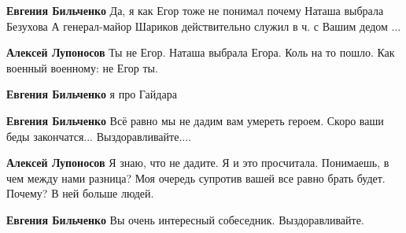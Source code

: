 \begin{itemize}
\begin{itemize}
\textbf{Евгения Бильченко} Да, я как Егор тоже не понимал почему Наташа выбрала Безухова \Smiley[1.0][yellow] А генерал-майор Шариков действительно служил в ч. с Вашим дедом ...

 
\textbf{Алексей Лупоносов} Ты не Егор. Наташа выбрала Егора. Коль на то пошло. Как военный военному: не Егор ты.

 
\textbf{Евгения Бильченко} я про Гайдара \Smiley[1.0][yellow]

 
\textbf{Евгения Бильченко} Всё равно мы не дадим вам умереть героем. Скоро ваши беды закончатся... Выздоравливайте....

 
\textbf{Алексей Лупоносов} Я знаю, что не дадите. Я и это просчитала. Понимаешь, в чем между нами разница? Моя очередь супротив вашей все равно брать будет. Почему? В ней больше людей.

 
\textbf{Евгения Бильченко} Вы очень интересный собеседник. Выздоравливайте.

\end{itemize}

 

\end{itemize}
